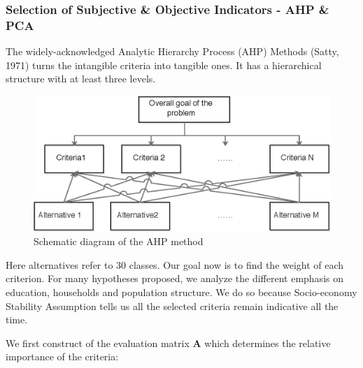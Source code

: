 \documentclass{mcmthesis}
\begin{document}
\subsubsection{Selection of Subjective \& Objective Indicators - AHP \& PCA}
The widely-acknowledged Analytic Hierarchy Process (AHP) Methods (Satty, 1971) turns the intangible criteria into tangible ones. It has a hierarchical structure with at least three levels.

\begin{figure}[htbp!]
\centering
	\includegraphics{1}
	\caption{Schematic diagram of the AHP method}
\end{figure}

Here alternatives refer to 30 classes. Our goal now is to find the weight of each criterion. For many hypotheses proposed, we analyze the different emphasis on education, households and population structure. We do so because Socio-economy Stability Assumption tells us all the selected criteria remain indicative all the time.

We first construct of the evaluation matrix $\mathbf{A}$ which determines the relative importance of the criteria:
\end{document}
